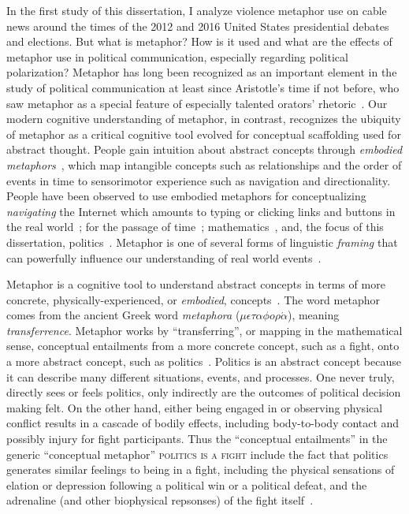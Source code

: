 \documentclass[12pt,letterpaper]{article}
\begin{document}
In the first study of this dissertation, I analyze violence metaphor use on
cable news around the times of the 2012 and 2016 United States presidential
debates and elections. But what is metaphor? How is it used and what are the
effects of metaphor use in political communication, especially regarding
political polarization? Metaphor has long been recognized as an important 
element in the study of political 
communication at least since Aristotle's time if not before, 
who saw metaphor as a special 
feature of especially talented orators' rhetoric~\cite{Aristotle1965,Kirby1997}. Our
modern cognitive understanding of metaphor, in contrast, recognizes the
ubiquity of metaphor as a critical cognitive tool evolved for 
conceptual scaffolding used for abstract thought.  
People gain intuition about abstract concepts through
\emph{embodied metaphors}~\cite{Gibbs2006,Gibbs2010}, which map intangible
concepts such as relationships and the order of events in time to sensorimotor
experience such as navigation and directionality. 
People have been observed to use embodied metaphors for conceptualizing
\emph{navigating} the Internet which amounts to typing or clicking links and buttons
in the real world~\cite{Matlock2014};
for the passage of time~\cite{Matlock2005,Nunez2012,Flusberg2017a}; 
mathematics~\cite{Lakoff1997,Marghetis2013}, 
and, the focus of this dissertation, politics~\cite{Lakoff2008,Charteris-Black2009}.
Metaphor is one of several forms of linguistic \emph{framing} that can 
powerfully influence our understanding of real world 
events~\cite{Fillmore1982,Chong2007,Fausey2011,Matlock2012,Sagi2013a,Cacciatore2016}.

Metaphor is a cognitive tool to understand abstract concepts in terms of more
concrete, physically-experienced, or \emph{embodied}, 
concepts~\cite{Lakoff1980,Gibbs2006,Gibbs2008,Gibbs2010}. The word metaphor
comes from the ancient Greek word \emph{metaphora} 
($\mu \epsilon \tau \alpha \phi o \rho \acute{\alpha}$), meaning
\emph{transferrence}. Metaphor works by ``transferring'', or mapping in
the mathematical sense, conceptual entailments
from a more concrete concept, such as a fight, onto a more abstract concept,
such as politics~\cite{Regier1996,Kovecses2010a,Lakoff2014}. 
Politics is an abstract concept because it can describe many
different situations, events, and processes. One never truly, directly sees or feels
politics, only indirectly are the outcomes of political decision making felt. 
On the other hand, either being engaged in or observing physical conflict
results in a cascade of bodily effects, including body-to-body contact and
possibly injury for fight participants. Thus the ``conceptual entailments'' in
the generic ``conceptual metaphor'' \textsc{politics is a fight} include the
fact that politics generates similar feelings to being in a fight, including
the physical sensations of elation or depression following a political win
or a political defeat, and the adrenaline (and other biophysical repsonses)
of the fight itself~\cite{Gallese2005,David2016}. 
\end{document}
